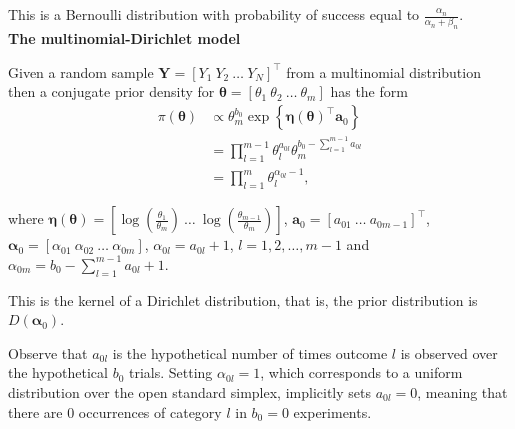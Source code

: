\begin{enumerate}
This is a Bernoulli distribution with probability of success equal to $\frac{\alpha_n}{\alpha_n+\beta_n}$.\\ 

\textbf{The multinomial-Dirichlet model}

Given a random sample $\bm{Y}=[Y_1 \ Y_2 \ \dots \ Y_N]^{\top}$ from a multinomial distribution then a conjugate prior density for $\bm{\theta}=\left[\theta_1 \ \theta_2 \ \dots \ \theta_m\right]$ has the form 
\begin{align}
	\pi(\bm{\theta})&\propto \theta_m^{b_0} \exp\left\{\bm{\eta}(\bm{\theta})^{\top}\bm{a}_0\right\}\nonumber\\
	& = \prod_{l=1}^{m-1}\theta_l^{a_{0l}}\theta_m^{b_0-\sum_{l=1}^{m-1}a_{0l}}\nonumber\\
	& = \prod_{l=1}^{m}\theta_l^{\alpha_{0l}-1},\nonumber
\end{align}

where $\bm{\eta}(\bm{\theta})=\left[\log\left(\frac{\theta_1}{\theta_m}\right) \ \dots \ \log\left(\frac{\theta_{m-1}}{\theta_m}\right)\right]$, $\bm{a}_0=\left[a_{01} \ \dots \ a_{0m-1}\right]^{\top}$, $\bm{\alpha}_0=\left[\alpha_{01} \ \alpha_{02} \ \dots \ \alpha_{0m}\right]$, $\alpha_{0l}=a_{0l}+1$, $l=1,2,\dots,m-1$ and $\alpha_{0m}=b_0-\sum_{l=1}^{m-1} a_{0l}+1$. 

This is the kernel of a Dirichlet distribution, that is, the prior distribution is $D(\bm{\alpha}_0)$.

Observe that \( a_{0l} \) is the hypothetical number of times outcome \( l \) is observed over the hypothetical \( b_0 \) trials. Setting \( \alpha_{0l} = 1 \), which corresponds to a uniform distribution over the open standard simplex, implicitly sets \( a_{0l} = 0 \), meaning that there are 0 occurrences of category \( l \) in \( b_0 = 0 \) experiments.  


\end{enumerate}
